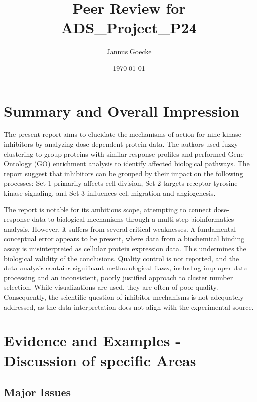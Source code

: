 \documentclass[11pt, a4paper]{article}
\begin{document}
\title{\textbf{Peer Review for ADS\_Project\_P24}}
\author{Jannus Goecke}
\date{\today}
\maketitle

\section{Summary and Overall Impression}

The present report aims to elucidate the mechanisms of action for nine kinase inhibitors by analyzing dose-dependent protein data. The authors used fuzzy clustering to group proteins with similar response profiles and performed Gene Ontology (GO) enrichment analysis to identify affected biological pathways. The report suggest that inhibitors can be grouped by their impact on the following processes: Set 1 primarily affects cell division, Set 2 targets receptor tyrosine kinase signaling, and Set 3 influences cell migration and angiogenesis.

The report is notable for its ambitious scope, attempting to connect dose-response data to biological mechanisms through a multi-step bioinformatics analysis. However, it suffers from several critical weaknesses. A fundamental conceptual error appears to be present, where data from a biochemical binding assay is misinterpreted as cellular protein expression data. This undermines the biological validity of the conclusions. Quality control is not reported, and the data analysis contains significant methodological flaws, including improper data processing and an inconsistent, poorly justified approach to cluster number selection. While visualizations are used, they are often of poor quality. Consequently, the scientific question of inhibitor mechanisms is not adequately addressed, as the data interpretation does not align with the experimental source.

\section{Evidence and Examples - Discussion of specific Areas}

\subsection{Major Issues}
\end{document}
